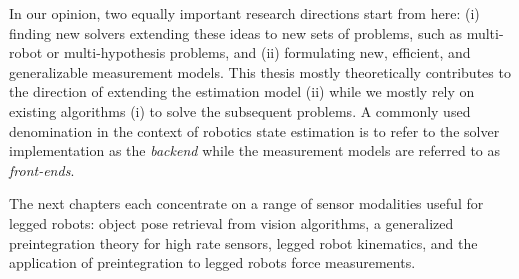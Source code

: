 In our opinion, two equally important research directions start from here: (i) finding new solvers extending these ideas to new sets of problems, such as multi-robot or multi-hypothesis problems, and (ii)
formulating new, efficient, and generalizable measurement models. This thesis mostly theoretically contributes to the direction of extending
the estimation model (ii) while we mostly rely on existing algorithms (i) to solve the subsequent problems.
A commonly used denomination in the context of robotics state estimation is to refer to the solver implementation as the \textit{backend} while the measurement models are referred to as \textit{front-ends}.

The next chapters each concentrate on a range of sensor modalities useful for legged robots:
object pose retrieval from vision algorithms, a generalized preintegration theory for high rate sensors, legged robot kinematics, and the application 
of preintegration to legged robots force measurements.





